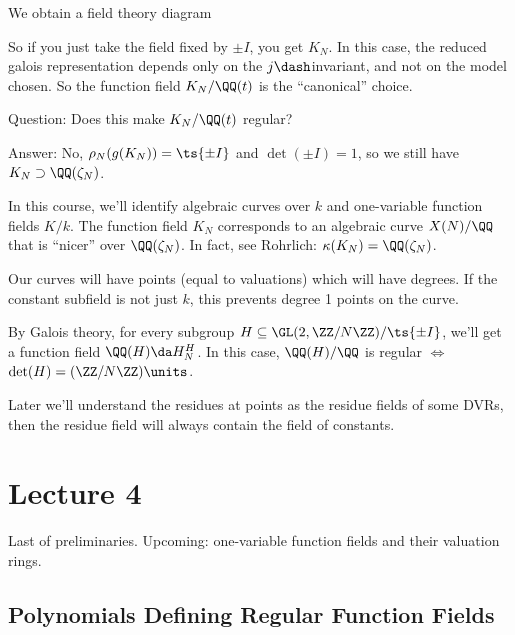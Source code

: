 We obtain a field theory diagram

\begin{center}
\end{center}

So if you just take the field fixed by \(\pm I\), you get \(K_N\). In
this case, the reduced galois representation depends only on the
\(j\dash\)invariant, and not on the model chosen. So the function field
\(K_N/\QQ(t)\) is the ``canonical'' choice.

Question: Does this make \(K_N/\QQ(t)\) regular?

Answer: No, \(\rho_N(g(K_N)) = \ts{\pm I}\) and \(\det(\pm I) = 1\), so
we still have \(K_N \supset \QQ(\zeta_N)\).

In this course, we'll identify algebraic curves over \(k\) and
one-variable function fields \(K/k\). The function field \(K_N\)
corresponds to an algebraic curve \(X(N)/\QQ\) that is ``nicer'' over
\(\QQ(\zeta_N)\). In fact, see Rohrlich: \(\kappa(K_N) = \QQ(\zeta_N)\).

Our curves will have points (equal to valuations) which will have
degrees. If the constant subfield is not just \(k\), this prevents
degree 1 points on the curve.

By Galois theory, for every subgroup
\(H \subseteq \GL(2, \ZZ/N\ZZ) / \ts{\pm I}\), we'll get a function
field \(\QQ(H) \da H_N^H\). In this case, \(\QQ(H)/\QQ\) is regular
\(\iff\) \(\det(H) = (\ZZ/N\ZZ)\units\).

Later we'll understand the residues at points as the residue fields of
some DVRs, then the residue field will always contain the field of
constants.

\hypertarget{lecture-4}{%
\section{Lecture 4}\label{lecture-4}}

Last of preliminaries. Upcoming: one-variable function fields and their
valuation rings.

\hypertarget{polynomials-defining-regular-function-fields}{%
\subsection{Polynomials Defining Regular Function
Fields}\label{polynomials-defining-regular-function-fields}}

